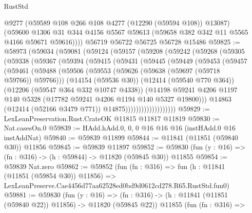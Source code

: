 \begin{lexlean}{RustStd}
\begin{coremodule}
        @9277
        (@59589 @108 @266 @108 @4277 (@12290 (@59594 @108)) @13087)
        (@59600
          @1306
          @31
          @344
          @4156
          @5567
          @59613
          (@59658 @382 @342 @11 @5565 @4166 @59671 @59616))))
    @56719
    @56722
    @56725
    @56728
    @15486
@59825 := @58973
    (@59034
      (@59081
        (@59124
          (@59157
            (@59208
              (@59242
                (@59268
                  (@59305
                    (@59338
                      (@59367
                        (@59394
                          (@59415
                            (@59431
                              (@59445
                                (@59449
                                  (@59453
                                    (@59457
                                      (@59461
                                        (@59488
                                          (@59506
                                            (@59553
                                              (@59626 (@59638 (@59697 (@59718 @59766)) @59766)))
                                            (@14154 (@59536 @30))
                                            (@12414 (@59540 @770 @364))
                                            (@12206 (@59547 @364 @332 @10747 @4338))
                                            (@14198
                                              @59241
                                              @4206
                                              @1197
                                              @140
                                              @5328
                                              (@17782 @59241 @4206 @1194 @140 @5327 @19800)))
                                          @14863
                                          (@12414 (@52166 @3479 @771))
                                          @14875)))))))))))))))))))
@59829 := LexLeanPreservation.Rust.CrateOK @11815 @11817 @11819
@59830 := Nat.casesOn.{0}
@59839 := HAdd.hAdd.{0, 0, 0} @16 @16 @16 (instHAdd.{0} @16 instAddNat)
@59840 := @59839 @11899
@59844 := @11841 (@11851 (@59840 @30)) @11856
@59845 := @59839 @11897
@59852 := @59830 (fun (y : @16) => (fn : @316) -> (h : @59844) -> @11820 (@59845 @30)) @11855
@59854 := @59839 Nat.zero
@59862 := @59852
    (fun (fn : @316) =>
    fun (h : @11841 (@11851 (@59854 @30)) @11856) =>
    LexLeanPreserve.Cae4456d77aa62528ed0bd9d0612cd278.R65.RustStd.fun0)
@59881 := @59830
    (fun (y : @16) =>
    (fn : @316) -> (h : @11841 (@11851 (@59840 @22)) @11856) -> @11820 (@59845 @22))
    @11855
    (fun (fn : @316) =>

\end{coremodule}
\end{lexlean}
